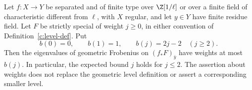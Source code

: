 \begin{proposition}
\label{c:improved-zero-weight}
Let $f:X\to Y$ be separated and of finite type over $\Z[1/\ell]$
or over a finite field of characteristic different from $\ell$, with
$X$ regular, and let $y\in Y$ have finite residue field.  Let $F$ be
strictly special of weight $j\geq0$, in either convention of
Definition~\ref{c:level-def}.  Put
\[
 b(0)=0,\qquad b(1)=1,\qquad b(j)=2j-2\quad(j\geq2).
\]
Then the eigenvalues of geometric Frobenius on
$(f_*F)_{\bar y}$ have weights at most $b(j)$.
In particular, the expected bound $j$ holds for $j\leq2$.
The assertion about weights does not replace the geometric level
definition or assert a corresponding smaller level.
\end{proposition}

